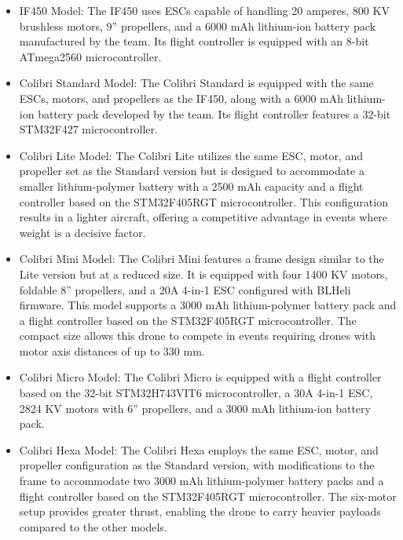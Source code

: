 \documentclass[conference]{IEEEtran}
\begin{document}
\begin{itemize}
    \item IF450 Model: The IF450 uses ESCs capable of handling 20 amperes, 800 KV brushless motors, 9” propellers, and a 6000 mAh lithium-ion battery pack manufactured by the team. Its flight controller is equipped with an 8-bit ATmega2560 microcontroller.
    
    \item Colibri Standard Model: The Colibri Standard is equipped with the same ESCs, motors, and propellers as the IF450, along with a 6000 mAh lithium-ion battery pack developed by the team. Its flight controller features a 32-bit STM32F427 microcontroller.
    
    \item Colibri Lite Model: The Colibri Lite utilizes the same ESC, motor, and propeller set as the Standard version but is designed to accommodate a smaller lithium-polymer battery with a 2500 mAh capacity and a flight controller based on the STM32F405RGT microcontroller. This configuration results in a lighter aircraft, offering a competitive advantage in events where weight is a decisive factor.

    \item Colibri Mini Model: The Colibri Mini features a frame design similar to the Lite version but at a reduced size. It is equipped with four 1400 KV motors, foldable 8” propellers, and a 20A 4-in-1 ESC configured with BLHeli firmware. This model supports a 3000 mAh lithium-polymer battery pack and a flight controller based on the STM32F405RGT microcontroller. The compact size allows this drone to compete in events requiring drones with motor axis distances of up to 330 mm.

    \item Colibri Micro Model: The Colibri Micro is equipped with a flight controller based on the 32-bit STM32H743VIT6 microcontroller, a 30A 4-in-1 ESC, 2824 KV motors with 6” propellers, and a 3000 mAh lithium-ion battery pack.

    \item Colibri Hexa Model: The Colibri Hexa employs the same ESC, motor, and propeller configuration as the Standard version, with modifications to the frame to accommodate two 3000 mAh lithium-polymer battery packs and a flight controller based on the STM32F405RGT microcontroller. The six-motor setup provides greater thrust, enabling the drone to carry heavier payloads compared to the other models.
    
\end{itemize}
\end{document}
